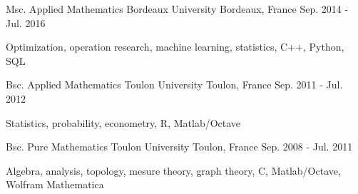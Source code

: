 

\begin{cventries}

  \cventry
    {Msc. Applied Mathematics} %
    {Bordeaux University} %
    {Bordeaux, France} %
    {Sep. 2014 - Jul. 2016} %
    {
      \begin{cvitems} %
        \item {Optimization, operation research, machine learning, statistics, C++, Python, SQL}
      \end{cvitems}
    }


\cventry
    {Bsc. Applied Mathematics} %
    {Toulon University} %
    {Toulon, France} %
    {Sep. 2011 - Jul. 2012} %
    {
      \begin{cvitems} %
        \item {Statistics, probability, econometry, R, Matlab/Octave}
      \end{cvitems}
    }


\cventry
    {Bsc. Pure Mathematics} %
    {Toulon University} %
    {Toulon, France} %
    {Sep. 2008 - Jul. 2011} %
    {
      \begin{cvitems} %
        \item {Algebra, analysis, topology, mesure theory, graph theory, C, Matlab/Octave, Wolfram Mathematica}
      \end{cvitems}
    }



\end{cventries}
